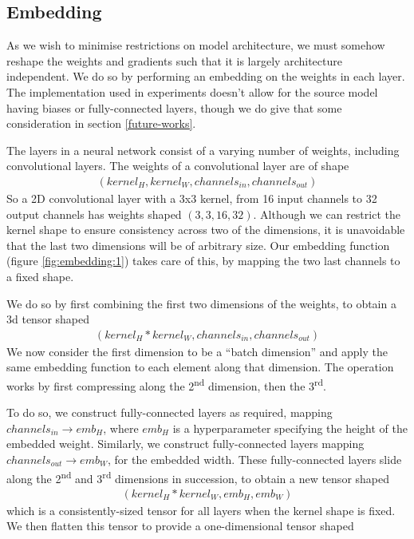 \documentclass{report}
\begin{document}
\subsection{Embedding}
As we wish to minimise restrictions on model architecture, we must somehow reshape the weights and gradients such that it is largely architecture independent. We do so by performing an embedding on the weights in each layer. The implementation used in experiments doesn't allow for the source model having biases or fully-connected layers, though we do give that some consideration in section \ref{future-works}. \par
The layers in a neural network consist of a varying number of weights, including convolutional layers. The weights of a convolutional layer are of shape
\begin{align}
	(kernel_{H}, kernel_{W}, channels_{in}, channels_{out})
\end{align}
So a 2D convolutional layer with a 3x3 kernel, from 16 input channels to 32 output channels has weights shaped $(3, 3, 16, 32)$. Although we can restrict the kernel shape to ensure consistency across two of the dimensions, it is unavoidable that the last two dimensions will be of arbitrary size. Our embedding function (figure \ref{fig:embedding:1}) takes care of this, by mapping the two last channels to a fixed shape. \par
We do so by first combining the first two dimensions of the weights, to obtain a 3d tensor shaped
\begin{align}
	(kernel_{H}*kernel_{W}, channels_{in}, channels_{out})
\end{align}
We now consider the first dimension to be a ``batch dimension'' and apply the same embedding function to each element along that dimension. The operation works by first compressing along the 2\textsuperscript{nd} dimension, then the 3\textsuperscript{rd}. \par
To do so, we construct fully-connected layers as required, mapping $channels_{in} \rightarrow emb_H$, where $emb_H$ is a hyperparameter specifying the height of the embedded weight. Similarly, we construct fully-connected layers mapping $channels_{out} \rightarrow emb_W$, for the embedded width. These fully-connected layers slide along the 2\textsuperscript{nd} and 3\textsuperscript{rd} dimensions in succession, to obtain a new tensor shaped
\begin{align}
(kernel_{H}*kernel_{W}, emb_H, emb_W)
\end{align}
which is a consistently-sized tensor for all layers when the kernel shape is fixed. We then flatten this tensor to provide a one-dimensional tensor shaped 
\end{document}

